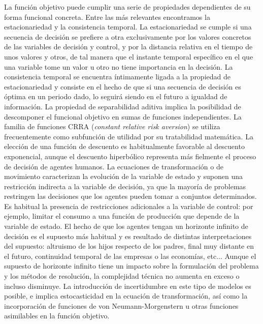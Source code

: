 \documentclass{nuevotema}
\begin{document}
La función objetivo puede cumplir una serie de propiedades dependientes de su forma funcional concreta. Entre las más relevantes encontramos la estacionariedad y la consistencia temporal. La estacionariedad se cumple si una secuencia de decisión se prefiere a otra exclusivamente por los valores concretos de las variables de decisión y control, y por la distancia relativa en el tiempo de unos valores y otros, de tal manera que el instante temporal específico en el que una variable tome un valor u otro no tiene importancia en la decisión. La consistencia temporal se encuentra íntimamente ligada a la propiedad de estacionariedad y consiste en el hecho de que si una secuencia de decisión es óptima en un periodo dado, lo seguirá siendo en el futuro a igualdad de información. La propiedad de separabilidad aditiva implica la posibilidad de descomponer el funcional objetivo en sumas de funciones independientes. La familia de funciones CRRA (\textit{constant relative risk aversion}) se utiliza frecuentemente como subfunción de utilidad por su tratabilidad matemática. La elección de una función de descuento es habitualmente favorable al descuento exponencial, aunque el descuento hiperbólico representa más fielmente el proceso de decisión de agentes humanos. La ecuaciones de transformación o de movimiento caracterizan la evolución de la variable de estado y suponen una restricción indirecta a la variable de decisión, ya que la mayoría de problemas restringen las decisiones que los agentes pueden tomar a conjuntos determinados. Es habitual la presencia de restricciones adicionales a la variable de control: por ejemplo, limitar el consumo a una función de producción que depende de la variable de estado. El hecho de que los agentes tengan un horizonte infinito de decisión es el supuesto más habitual y es resultado de distintas interpretaciones del supuesto: altruismo de los hijos respecto de los padres, final muy distante en el futuro, continuidad temporal de las empresas o las economías, etc... Aunque el supuesto de horizonte infinito tiene un impacto sobre la formulación del problema y los métodos de resolución, la complejidad técnica no aumenta en exceso o incluso disminuye. La introducción de incertidumbre en este tipo de modelos es posible, e implica estocasticidad en la ecuación de transformación, así como la incorporación de funciones de von Neumann-Morgenstern u otras funciones asimilables en la función objetivo. 
\end{document}
